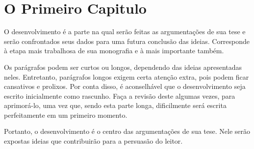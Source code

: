 \chapter{O Primeiro Capitulo}

O desenvolvimento é a parte na qual serão feitas as argumentações de sua tese e serão confrontados seus dados para uma futura conclusão das ideias. Corresponde à etapa mais trabalhosa de sua monografia e à mais importante também.

Os parágrafos podem ser curtos ou longos, dependendo das ideias apresentadas neles. Entretanto, parágrafos longos exigem certa atenção extra, pois podem ficar cansativos e prolixos. Por conta disso, é aconselhável que o desenvolvimento seja escrito inicialmente como rascunho. Faça a revisão deste algumas vezes, para aprimorá-lo, uma vez que, sendo esta parte longa, dificilmente será escrita perfeitamente em um primeiro momento.
	
Portanto, o desenvolvimento é o centro das argumentações de sua tese. Nele serão expostas ideias que contribuirão para a persuasão do leitor.